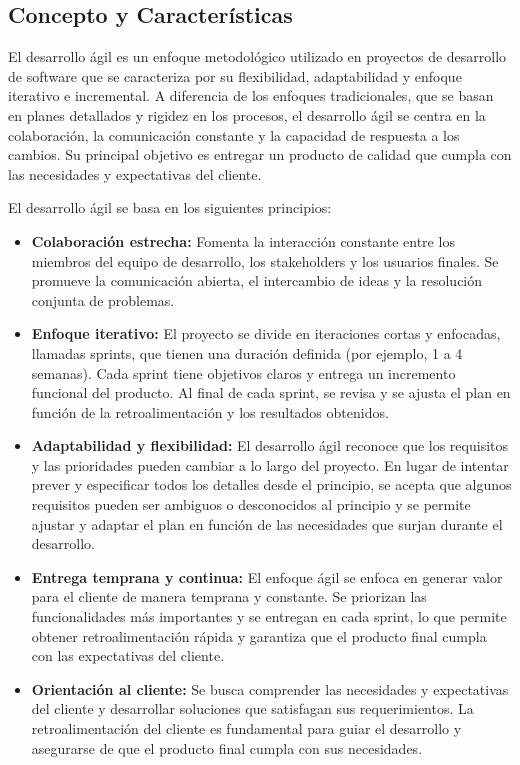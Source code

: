 \subsection{Concepto y Características}

El desarrollo ágil es un enfoque metodológico utilizado en proyectos de desarrollo de software que se caracteriza por su flexibilidad, adaptabilidad y enfoque iterativo e incremental. A diferencia de los enfoques tradicionales, que se basan en planes detallados y rigidez en los procesos, el desarrollo ágil se centra en la colaboración, la comunicación constante y la capacidad de respuesta a los cambios. Su principal objetivo es entregar un producto de calidad que cumpla con las necesidades y expectativas del cliente.

El desarrollo ágil se basa en los siguientes principios:

\begin{itemize}
\item \textbf{Colaboración estrecha:} Fomenta la interacción constante entre los miembros del equipo de desarrollo, los stakeholders y los usuarios finales. Se promueve la comunicación abierta, el intercambio de ideas y la resolución conjunta de problemas.
\item \textbf{Enfoque iterativo:} El proyecto se divide en iteraciones cortas y enfocadas, llamadas sprints, que tienen una duración definida (por ejemplo, 1 a 4 semanas). Cada sprint tiene objetivos claros y entrega un incremento funcional del producto. Al final de cada sprint, se revisa y se ajusta el plan en función de la retroalimentación y los resultados obtenidos.
\item \textbf{Adaptabilidad y flexibilidad:} El desarrollo ágil reconoce que los requisitos y las prioridades pueden cambiar a lo largo del proyecto. En lugar de intentar prever y especificar todos los detalles desde el principio, se acepta que algunos requisitos pueden ser ambiguos o desconocidos al principio y se permite ajustar y adaptar el plan en función de las necesidades que surjan durante el desarrollo.
\item \textbf{Entrega temprana y continua:} El enfoque ágil se enfoca en generar valor para el cliente de manera temprana y constante. Se priorizan las funcionalidades más importantes y se entregan en cada sprint, lo que permite obtener retroalimentación rápida y garantiza que el producto final cumpla con las expectativas del cliente.
\item \textbf{Orientación al cliente:} Se busca comprender las necesidades y expectativas del cliente y desarrollar soluciones que satisfagan sus requerimientos. La retroalimentación del cliente es fundamental para guiar el desarrollo y asegurarse de que el producto final cumpla con sus necesidades.
\end{itemize}

